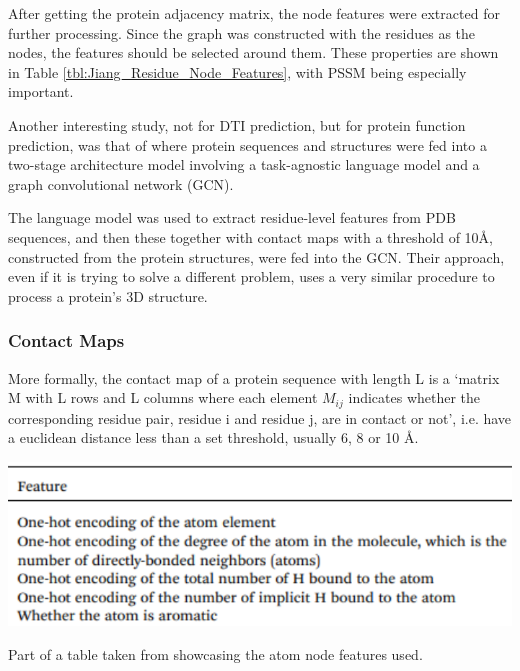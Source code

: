 After getting the protein adjacency matrix, the node features were extracted for further processing. Since the graph was constructed with the residues as the nodes, the features should be selected around them. These properties are shown in Table \ref{tbl:Jiang_Residue_Node_Features}, with PSSM being especially important.

Another interesting study, not for DTI prediction, but for protein function prediction, was that of \citet{Gligorijević} where protein sequences and structures were fed into a two-stage architecture model involving a task-agnostic language model and a graph convolutional network (GCN). 

The language model was used to extract residue-level features from PDB sequences, and then these together with contact maps with a threshold of 10\AA, constructed from the protein structures, were fed into the GCN. Their approach, even if it is trying to solve a different problem, uses a very similar procedure to process a protein's 3D structure.

\subsubsection{Contact Maps}
\label{subsubsec:Contact_Maps}

More formally, the contact map of a protein sequence with length L is a `matrix M with L rows and L columns where each element $M_{ij}$ indicates whether the corresponding residue pair, residue i and residue j, are in contact or not', i.e. have a euclidean distance less than a set threshold, usually 6, 8 or 10 \AA.

\begin{table}[!h]
  \centering
  \includegraphics[width=1.0\linewidth]{images/Jiang_Atom_Node_Features.pdf}
  \caption{Part of a table taken from \citet{Jiang2020} showcasing the atom node features used.}
  \label{tbl:Jiang_Atom_Node_Features}
\end{table}

